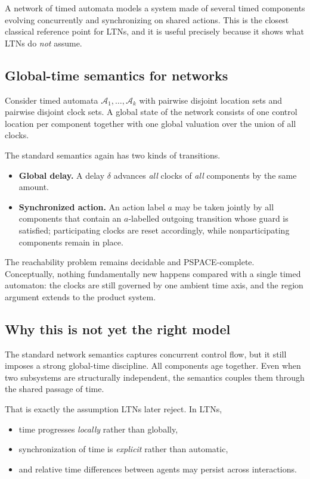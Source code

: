 A network of timed automata models a system made of several timed components evolving concurrently and synchronizing on shared actions. This is the closest classical reference point for LTNs, and it is useful precisely because it shows what LTNs do \emph{not} assume.

\subsection{Global-time semantics for networks}
\label{subsec:prelim-nta-global}

Consider timed automata $\mathcal{A}_1,\dots,\mathcal{A}_k$ with pairwise disjoint location sets and pairwise disjoint clock sets. A global state of the network consists of one control location per component together with one global valuation over the union of all clocks.

The standard semantics again has two kinds of transitions.
\begin{itemize}
    \item \textbf{Global delay.} A delay $\delta$ advances \emph{all} clocks of \emph{all} components by the same amount.
    \item \textbf{Synchronized action.} An action label $a$ may be taken jointly by all components that contain an $a$-labelled outgoing transition whose guard is satisfied; participating clocks are reset accordingly, while nonparticipating components remain in place.
\end{itemize}

The reachability problem remains decidable and PSPACE-complete. Conceptually, nothing fundamentally new happens compared with a single timed automaton: the clocks are still governed by one ambient time axis, and the region argument extends to the product system.

\subsection{Why this is not yet the right model}
\label{subsec:prelim-nta-contrast}

The standard network semantics captures concurrent control flow, but it still imposes a strong global-time discipline. All components age together. Even when two subsystems are structurally independent, the semantics couples them through the shared passage of time.

That is exactly the assumption LTNs later reject. In LTNs,
\begin{itemize}
    \item time progresses \emph{locally} rather than globally,
    \item synchronization of time is \emph{explicit} rather than automatic,
    \item and relative time differences between agents may persist across interactions.
\end{itemize}

